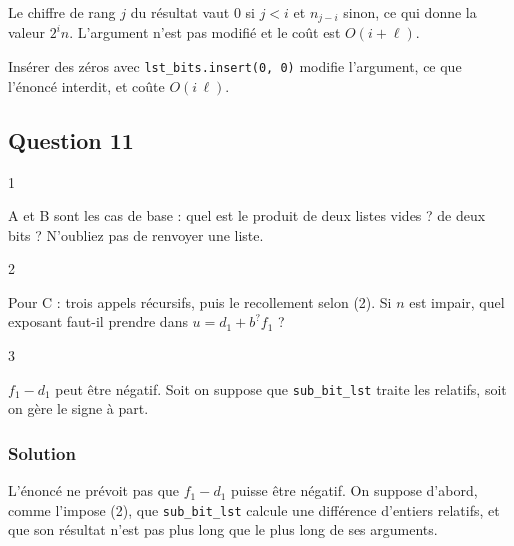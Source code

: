 \documentclass[11pt,a4paper]{article}
\begin{document}
Le chiffre de rang \(j\) du résultat vaut \(0\) si \(j < i\) et \(n_{j-i}\) sinon, ce qui donne la valeur \(2^i n\). L'argument n'est pas modifié et le coût est \(O(i + \ell)\).

\begin{piege}

Insérer des zéros avec \texttt{lst\_bits.insert(\allowbreak{}0,\allowbreak{}\ 0)\allowbreak{}} modifie l'argument, ce que l'énoncé interdit, et coûte \(O(i\,\ell)\).

\end{piege}

\hypertarget{question-11}{%
\subsection{Question 11}\label{question-11}}

\begin{indication}{1}

A et B sont les cas de base : quel est le produit de deux listes vides ? de deux bits ? N'oubliez pas de renvoyer une liste.

\end{indication}

\begin{indication}{2}

Pour C : trois appels récursifs, puis le recollement selon (2). Si \(n\) est impair, quel exposant faut-il prendre dans \(u = d_1 + b^{?} f_1\) ?

\end{indication}

\begin{indication}{3}

\(f_1 - d_1\) peut être négatif. Soit on suppose que \texttt{sub\_bit\_lst} traite les relatifs, soit on gère le signe à part.

\end{indication}

\hypertarget{solution-10}{%
\subsubsection{Solution}\label{solution-10}}

L'énoncé ne prévoit pas que \(f_1 - d_1\) puisse être négatif. On suppose d'abord, comme l'impose (2), que \texttt{sub\_bit\_lst} calcule une différence d'entiers relatifs, et que son résultat n'est pas plus long que le plus long de ses arguments.
\end{document}
